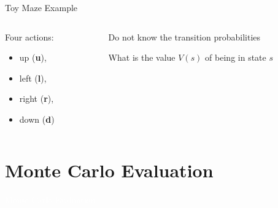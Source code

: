 \documentclass[11pt,table]{beamer}
\begin{document}
\begin{frame}{Toy Maze Example}
\vspace{6mm}
\centering
\begin{columns}
\begin{column}{0.4\textwidth}

Four actions:
\begin{itemize}
	\item up (\textbf{u}),
	\item left (\textbf{l}),
	\item right (\textbf{r}),
	\item down (\textbf{d})
\end{itemize}
\end{column}
\begin{column}{0.6\textwidth}
Do not know the transition probabilities

\vspace{3mm}
  \textcolor{red1}{What is the value $V(s)$ of being in state $s$}
\end{column}
\end{columns}
    
\end{frame}

\section{Monte Carlo Evaluation}
{
\begin{frame}
\centering
\Huge
\textcolor{white}{Monte Carlo Evaluation}
\thispagestyle{empty}
\end{frame}
}
\end{document}
